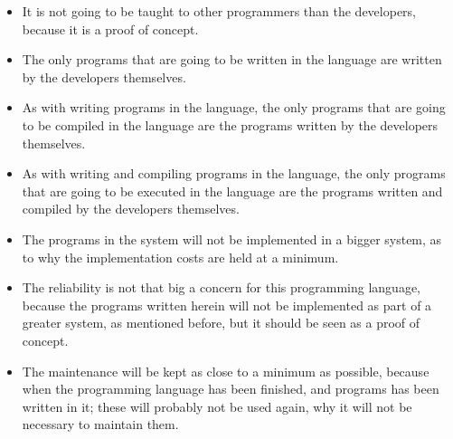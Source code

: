 \begin{itemize}
	\item It is not going to be taught to other programmers than the developers, because it is a proof of concept.
	\item The only programs that are going to be written in the language are written by the developers themselves.
	\item As with writing programs in the language, the only programs that are going to be compiled in the language are the programs written by the developers themselves.
	\item As with writing and compiling programs in the language, the only programs that are going to be executed in the language are the programs written and compiled by the developers themselves.
	\item The programs in the system will not be implemented in a bigger system, as to why the implementation costs are held at a minimum.
	\item The reliability is not that big a concern for this programming language, because the programs written herein will not be implemented as part of a greater system, as mentioned before, but it should be seen as a proof of concept.
	\item The maintenance will be kept as close to a minimum as possible, because when the programming language has been finished, and programs has been written in it; these will probably not be used again, why it will not be necessary to maintain them.
\end{itemize}

